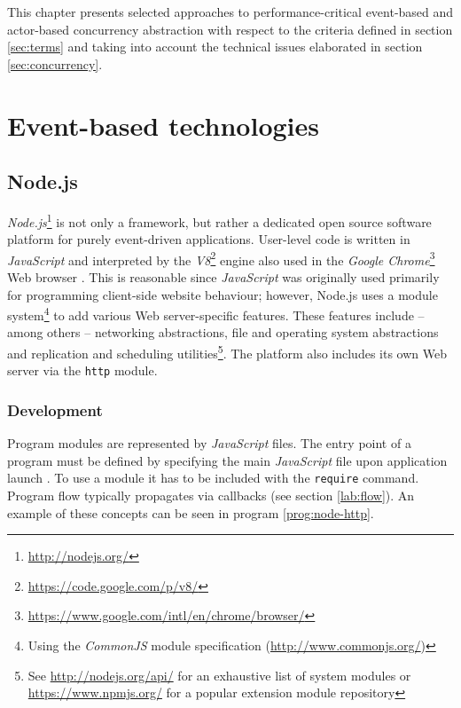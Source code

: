 This chapter presents selected approaches to performance-critical event-based and actor-based concurrency abstraction with respect to the criteria defined in section \ref{sec:terms} and taking into account the technical issues elaborated in section \ref{sec:concurrency}.

\section{Event-based technologies}
\label{sec:evnt}
\subsection{Node.js}
\label{sec:nodejs}

\textit{Node.js}\footnote{\url{http://nodejs.org/}} is not only a framework, but rather a dedicated open source software platform for purely event-driven applications. User-level code is written in \textit{JavaScript} and interpreted by the \textit{V8}\footnote{\url{https://code.google.com/p/v8/}} engine also used in the \textit{Google Chrome}\footnote{\url{https://www.google.com/intl/en/chrome/browser/}} Web browser \cite[p. 19]{Hughes-Croucher2012}. This is reasonable since \textit{JavaScript} was originally used primarily for programming client-side website behaviour; however, Node.js uses a module system\footnote{Using the \textit{CommonJS} module specification (\url{http://www.commonjs.org/})} to add various Web server-specific features. These features include -- among others -- networking abstractions, file and operating system abstractions and replication and scheduling utilities\footnote{See \url{http://nodejs.org/api/} for an exhaustive list of system modules or \url{https://www.npmjs.org/} for a popular extension module repository}. The platform also includes its own Web server via the \texttt{http} module.

\subsubsection*{Development}
\label{lab:nodehttp}
Program modules are represented by \textit{JavaScript} files. The entry point of a program must be defined by specifying the main \textit{JavaScript} file upon application launch \cite[p. 16]{Hughes-Croucher2012}. To use a module it has to be included with the \texttt{require} command. Program flow typically propagates via callbacks (see section \ref{lab:flow}). An example of these concepts can be seen in program \ref{prog:node-http}.

